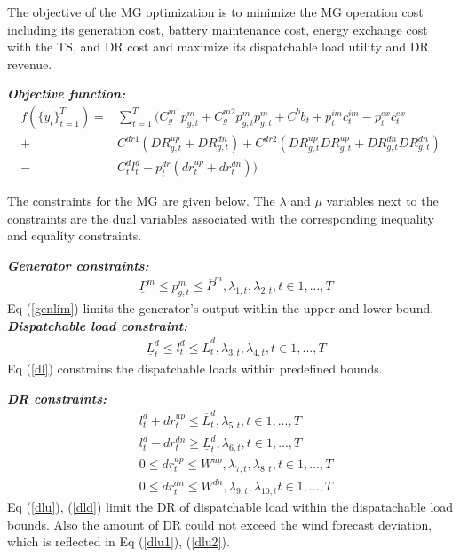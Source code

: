 The objective of the MG optimization is to minimize the MG operation cost including its generation cost, battery maintenance cost, energy exchange cost with the TS, and DR cost and maximize its dispatchable load utility and DR revenue.

\textbf{\emph{Objective function:} }
\begin{align*}
f(\{y_t\}^{T}_{t=1}) =& \sum_{t=1}^{T}(C^{m1}_g p^m_{g,t} +C^{m2}_g p^m_{g,t}  p^m_{g,t} +C^bb_t+p^{im}_{t}c^{im}_{t}-p^{ex}_{t}c^{ex}_{t}\\
+ &C^{dr1} (DR^{up}_{g,t} + DR^{dn}_{g,t} ) + C^{dr2} (DR^{up}_{g,t}DR^{up}_{g,t} + DR^{dn}_{g,t}DR^{dn}_{g,t}  ) \\
- &C^d_{t}l^d_{t}-p^{dr}_{t}(dr_{t}^{up}+dr_{t}^{dn}))
\end{align*}

The constraints for the MG are given below. The $\lambda$ and $\mu$ variables next to the constraints are the dual variables associated with the corresponding inequality and equality constraints.

\textbf{\emph{Generator constraints:} }
\begin{align}
&\underline P^m\leq p^m_{g,t}\leq  \overline P^m\label{genlim}, \lambda_{1,t},\lambda_{2,t},t\in{1,...,T} 
\end{align}
Eq (\ref{genlim}) limits the generator's output within the upper and lower bound.\\

\textbf{\emph{Dispatchable load constraint:} }
\begin{align}
&\underline{L}^d_{t}\leq l^d_{t}\leq \overline{L}^d_{t}\label{dl}, \lambda_{3,t},\lambda_{4,t},t\in{1,...,T} 
\end{align} 
Eq (\ref{dl}) constrains the dispatchable loads within predefined bounds. 

\textbf{\emph{DR constraints:} }
\begin{align}
&l^d_{t}+dr_{t}^{up}\leq \overline{L}^d_{t}, \lambda_{5,t},t\in{1,...,T} \label{dlu}\\
&l^d_{t}-dr_{t}^{dn}\geq \underline{L}^d_{t},\lambda_{6,t},t\in{1,...,T} \label{dld} \\
&0\leq dr_{t}^{up}\leq W^{up}, \lambda_{7,t},\lambda_{8,t},t\in{1,...,T} \label{dlu1}\\
&0\leq dr_{t}^{dn}\leq W^{dn}, \lambda_{9,t},\lambda_{10,t}t\in{1,...,T} \label{dlu2}
\end{align} 
Eq (\ref{dlu}), (\ref{dld}) limit the DR of dispatchable load within the dispatachable load bounds. Also the amount of DR could not exceed the wind forecast deviation, which is reflected in Eq (\ref{dlu1}), (\ref{dlu2}).


